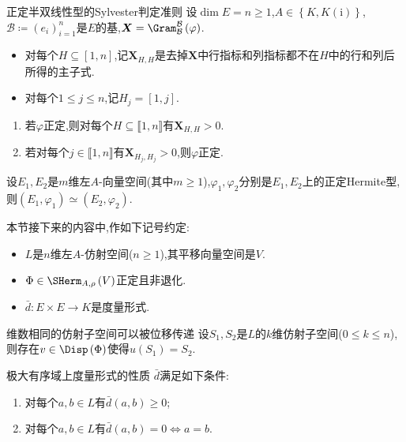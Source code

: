 \begin{proposition}{正定半双线性型的Sylvester判定准则}{}
	设$\dim E=n\geq 1$,$A\in\left\{K,K(\mathrm{i})\right\}$,$\mathcal{B}\coloneq\left(e_{i}\right)_{i=1}^{n}$是$E$的基,$\boldsymbol{X}=\Gram_{\mathcal{B}}^{\mathcal{B}}\left(\varphi\right)$.
	\begin{itemize}
		\item 对每个$H\subseteq\left[1,n\right]$,记$\boldsymbol{X}_{H,H}$是去掉$\boldsymbol{X}$中行指标和列指标都不在$H$中的行和列后所得的主子式.
		\item 对每个$1\leq j\leq n$,记$H_{j}=\left[1,j\right]$.
	\end{itemize}
	\begin{enumerate}
		\item 若$\varphi$正定,则对每个$H\subseteq\llbracket 1,n\rrbracket$有$\boldsymbol{X}_{H,H}>0$.
		\item 若对每个$j\in\llbracket 1,n\rrbracket$有$\boldsymbol{X}_{H_{j},H_{j}}>0$,则$\varphi$正定.
	\end{enumerate}
\end{proposition}

\begin{lemma}{}{}
	设$E_{1},E_{2}$是$m$维左$A$-向量空间(其中$m\geq 1$),$\varphi_{1},\varphi_{2}$分别是$E_{1},E_{2}$上的正定Hermite型,则$\left(E_{1},\varphi_{1}\right)\simeq\left(E_{2},\varphi_{2}\right)$.
\end{lemma}

本节接下来的内容中,作如下记号约定:
\begin{itemize}
	\item $L$是$n$维左$A$-仿射空间($n\geq 1$),其平移向量空间是$V$.
	\item $\Phi\in\SHerm_{A,\rho}\left(V\right)$正定且非退化.
	\item $\bar{d}:E\times E\to K$是度量形式.
\end{itemize}

\begin{proposition}{维数相同的仿射子空间可以被位移传递}{}
	设$S_{1},S_{2}$是$L$的$k$维仿射子空间($0\leq k\leq n$),则存在$v\in\Disp\left(\Phi\right)$使得$u\left(S_{1}\right)=S_{2}$.
\end{proposition}

\begin{lemma}{极大有序域上度量形式的性质}{}
	$\bar{d}$满足如下条件:
	\begin{enumerate}
		\item 对每个$a,b\in L$有$\bar{d}\left(a,b\right)\geq 0$;
		\item 对每个$a,b\in L$有$\bar{d}\left(a,b\right)=0\iff a=b$.
	\end{enumerate}
\end{lemma}

